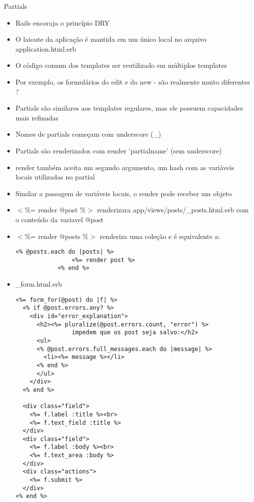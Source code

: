 \begin{frame}{Partials}
	\begin{itemize}
		\item Rails encoraja o princípio \alert{DRY}	
		\item O laioute da aplicação é mantida em um único local no arquivo \alert{application.html.erb}
		\item O código comum dos templates ser reutilizado em \alert{múltiplos templates}
		\item Por exemplo, os formulários do \alert{edit} e do \alert{new} - são realmente muito diferentes ?
		\item Partials são similares aos templates regulares, mas ele possuem capacidades mais \alert{refinadas}
		\item Nomes de partials começam com \alert{underscore} (\_) 
		\item Partials são renderizados com \alert{render 'partialname'} (sem underscore)
		\item \alert{render} também aceita um segundo argumento, um hash com as variáveis locais utilizadas no partial
		\item Similar a passagem de variáveis locais, o \alert{render} pode receber um objeto
		\item \alert{$<$\%= render @post \%$>$} renderizara \alert{app/views/posts/\_posts.html.erb} com o conteúdo da variavel @post
\framebreak
		\item \alert{$<$\%= render @posts \%$>$} renderiza uma coleção e é equivalente a:
		\begin{lstlisting}[style=RubyInputStyle, caption=controllers/posts\_controller.rb]
			<% @posts.each do |posts| %> 
				<%= render post %>
			<% end %>
		\end{lstlisting}		
		\framebreak
		\item \alert{\_form.html.erb}
		\begin{lstlisting}[style=RubyInputStyle, caption=views/posts/\_form.html.erb]
<%= form_for(@post) do |f| %>
  <% if @post.errors.any? %>
    <div id="error_explanation">
      <h2><%= pluralize(@post.errors.count, "error") %> 
			    impedem que os post seja salvo:</h2>
      <ul>
      <% @post.errors.full_messages.each do |message| %>
        <li><%= message %></li>
      <% end %>
      </ul>
    </div>
  <% end %>

  <div class="field">
    <%= f.label :title %><br>
    <%= f.text_field :title %>
  </div>
  <div class="field">
    <%= f.label :body %><br>
    <%= f.text_area :body %>
  </div>
  <div class="actions">
    <%= f.submit %>
  </div>
<% end %>		
		\end{lstlisting}
	\end{itemize}	
\end{frame}


